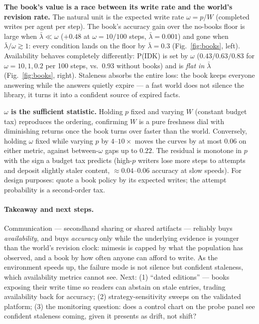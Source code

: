 \documentclass[10pt]{article}
\begin{document}
\textbf{The book's value is a race between its write rate and the world's revision rate.} The natural unit is the expected write rate $\omega = p/W$ (completed writes per agent per step). The book's accuracy gain over the no-books floor is large when $\bar\lambda \ll \omega$ ($+0.48$ at $\omega = 10/100$ steps, $\bar\lambda = 0.001$) and gone when $\bar\lambda/\omega \gtrsim 1$: every condition lands on the floor by $\bar\lambda = 0.3$ (Fig.~\ref{fig:books}, left). Availability behaves completely differently: P(IDK) is set by $\omega$ ($0.43/0.63/0.83$ for $\omega = 10, 1, 0.2$ per 100 steps, vs.\ $0.93$ without books) and is \emph{flat in $\bar\lambda$} (Fig.~\ref{fig:books}, right). Staleness absorbs the entire loss: the book keeps everyone answering while the answers quietly expire --- a fast world does not silence the library, it turns it into a confident source of expired facts.

\textbf{$\omega$ is the sufficient statistic.} Holding $p$ fixed and varying $W$ (constant budget tax) reproduces the ordering, confirming $W$ is a pure freshness dial with diminishing returns once the book turns over faster than the world. Conversely, holding $\omega$ fixed while varying $p$ by $4$--$10\times$ moves the curves by at most $0.06$ on either metric, against between-$\omega$ gaps up to $0.22$. The residual is monotone in $p$ with the sign a budget tax predicts (high-$p$ writers lose more steps to attempts and deposit slightly staler content, $\approx 0.04$--$0.06$ accuracy at slow speeds). For design purposes: quote a book policy by its expected writes; the attempt probability is a second-order tax.


\paragraph{Takeaway and next steps.} Communication --- secondhand sharing or shared artifacts --- reliably buys \emph{availability}, and buys \emph{accuracy} only while the underlying evidence is younger than the world's revision clock: mimesis is capped by what the population has observed, and a book by how often anyone can afford to write. As the environment speeds up, the failure mode is not silence but confident staleness, which availability metrics cannot see. Next: (1) ``dated editions'' --- books exposing their write time so readers can abstain on stale entries, trading availability back for accuracy; (2) strategy-sensitivity sweeps on the validated platform; (3) the monitoring question: does a control chart on the probe panel see confident staleness coming, given it presents as drift, not shift?

{\footnotesize

}
\end{document}
